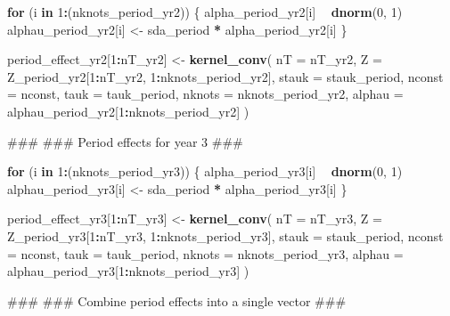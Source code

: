 \documentclass[11pt,]{article}
\newenvironment{Shaded}{\begin{snugshade}}{\end{snugshade}}
\newcommand{\KeywordTok}[1]{\textcolor[rgb]{0.13,0.29,0.53}{\textbf{#1}}}
\newcommand{\DataTypeTok}[1]{\textcolor[rgb]{0.13,0.29,0.53}{#1}}
\newcommand{\DecValTok}[1]{\textcolor[rgb]{0.00,0.00,0.81}{#1}}
\newcommand{\StringTok}[1]{\textcolor[rgb]{0.31,0.60,0.02}{#1}}
\newcommand{\ControlFlowTok}[1]{\textcolor[rgb]{0.13,0.29,0.53}{\textbf{#1}}}
\newcommand{\OperatorTok}[1]{\textcolor[rgb]{0.81,0.36,0.00}{\textbf{#1}}}
\newcommand{\NormalTok}[1]{#1}
\begin{document}
\begin{Shaded}
\begin{Highlighting}[]
  \ControlFlowTok{for}\NormalTok{ (i }\ControlFlowTok{in} \DecValTok{1}\OperatorTok{:}\NormalTok{(nknots_period_yr2)) \{}
\NormalTok{    alpha_period_yr2[i] }\OperatorTok{~}\StringTok{ }\KeywordTok{dnorm}\NormalTok{(}\DecValTok{0}\NormalTok{, }\DecValTok{1}\NormalTok{)}
\NormalTok{    alphau_period_yr2[i] <-}\StringTok{ }\NormalTok{sda_period }\OperatorTok{*}\StringTok{ }\NormalTok{alpha_period_yr2[i]}
\NormalTok{  \}}

\NormalTok{  period_effect_yr2[}\DecValTok{1}\OperatorTok{:}\NormalTok{nT_yr2] <-}\StringTok{ }\KeywordTok{kernel_conv}\NormalTok{(}
    \DataTypeTok{nT =}\NormalTok{ nT_yr2,}
    \DataTypeTok{Z =}\NormalTok{ Z_period_yr2[}\DecValTok{1}\OperatorTok{:}\NormalTok{nT_yr2, }\DecValTok{1}\OperatorTok{:}\NormalTok{nknots_period_yr2],}
    \DataTypeTok{stauk =}\NormalTok{ stauk_period,}
    \DataTypeTok{nconst =}\NormalTok{ nconst,}
    \DataTypeTok{tauk =}\NormalTok{ tauk_period,}
    \DataTypeTok{nknots =}\NormalTok{ nknots_period_yr2,}
    \DataTypeTok{alphau =}\NormalTok{ alphau_period_yr2[}\DecValTok{1}\OperatorTok{:}\NormalTok{nknots_period_yr2]}
\NormalTok{  )}

\NormalTok{  ###}
\NormalTok{  ### Period effects for year 3}
\NormalTok{  ###}

  \ControlFlowTok{for}\NormalTok{ (i }\ControlFlowTok{in} \DecValTok{1}\OperatorTok{:}\NormalTok{(nknots_period_yr3)) \{}
\NormalTok{    alpha_period_yr3[i] }\OperatorTok{~}\StringTok{ }\KeywordTok{dnorm}\NormalTok{(}\DecValTok{0}\NormalTok{, }\DecValTok{1}\NormalTok{)}
\NormalTok{    alphau_period_yr3[i] <-}\StringTok{ }\NormalTok{sda_period }\OperatorTok{*}\StringTok{ }\NormalTok{alpha_period_yr3[i]}
\NormalTok{  \}}

\NormalTok{  period_effect_yr3[}\DecValTok{1}\OperatorTok{:}\NormalTok{nT_yr3] <-}\StringTok{ }\KeywordTok{kernel_conv}\NormalTok{(}
    \DataTypeTok{nT =}\NormalTok{ nT_yr3,}
    \DataTypeTok{Z =}\NormalTok{ Z_period_yr3[}\DecValTok{1}\OperatorTok{:}\NormalTok{nT_yr3, }\DecValTok{1}\OperatorTok{:}\NormalTok{nknots_period_yr3],}
    \DataTypeTok{stauk =}\NormalTok{ stauk_period,}
    \DataTypeTok{nconst =}\NormalTok{ nconst,}
    \DataTypeTok{tauk =}\NormalTok{ tauk_period,}
    \DataTypeTok{nknots =}\NormalTok{ nknots_period_yr3,}
    \DataTypeTok{alphau =}\NormalTok{ alphau_period_yr3[}\DecValTok{1}\OperatorTok{:}\NormalTok{nknots_period_yr3]}
\NormalTok{  )}
  
\NormalTok{  ###}
\NormalTok{  ### Combine period effects into a single vector}
\NormalTok{  ###}


\end{Highlighting}
\end{Shaded}
\end{document}
